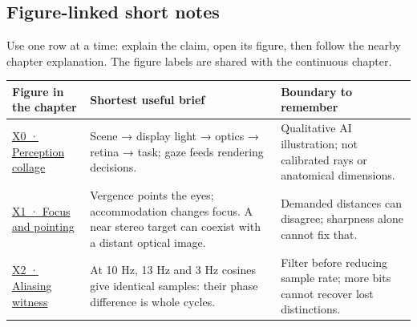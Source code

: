 \subsection{Figure-linked short notes}\label{appendix-73c6b8ed5a87-figure-linked-short-notes}

Use one row at a time: explain the claim, open its figure, then follow the nearby chapter explanation. The figure labels are shared with the continuous chapter.

{\def\LTcaptype{none} %
\begin{longtable}[]{@{}
  >{\raggedright\arraybackslash}p{}
  >{\raggedright\arraybackslash}p{}
  >{\raggedright\arraybackslash}p{}@{}}
\toprule\noalign{}
\begin{minipage}[b]{\linewidth}\raggedright
Figure in the chapter
\end{minipage} & \begin{minipage}[b]{\linewidth}\raggedright
Shortest useful brief
\end{minipage} & \begin{minipage}[b]{\linewidth}\raggedright
Boundary to remember
\end{minipage} \\
\midrule\noalign{}
\endhead
\bottomrule\noalign{}
\endlastfoot
\href{Continuous\%20Notes/University\%20-\%20Worlds,\%20Images\%20and\%20Inference\%20-\%20Graphics,\%20Vision\%20and\%20Photography\#Figure\%20X0\%20—\%20A\%20qualitative\%20picture\%20of\%20the\%20XR\%20loop/}{X0 · Perception collage} & Scene → display light → optics → retina → task; gaze feeds rendering decisions. & Qualitative AI illustration; not calibrated rays or anatomical dimensions. \\
\href{Continuous\%20Notes/University\%20-\%20Worlds,\%20Images\%20and\%20Inference\%20-\%20Graphics,\%20Vision\%20and\%20Photography\#Figure\%20X1\%20—\%20Two\%20simultaneous\%20depth\%20demands/}{X1 · Focus and pointing} & Vergence points the eyes; accommodation changes focus. A near stereo target can coexist with a distant optical image. & Demanded distances can disagree; sharpness alone cannot fix that. \\
\href{Continuous\%20Notes/University\%20-\%20Worlds,\%20Images\%20and\%20Inference\%20-\%20Graphics,\%20Vision\%20and\%20Photography\#Figure\%20X2\%20—\%20The\%20samples\%20cannot\%20name\%20their\%20original/}{X2 · Aliasing witness} & At 10 Hz, 13 Hz and 3 Hz cosines give identical samples: their phase difference is whole cycles. & Filter before reducing sample rate; more bits cannot recover lost distinctions. \\

\end{longtable}}
